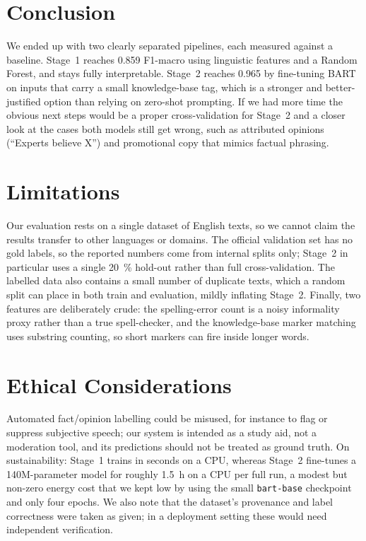 \documentclass[12pt,a4paper,twocolumn]{article}
\begin{document}
\section{Conclusion}
\label{sec:conclusion}
We ended up with two clearly separated pipelines, each measured against a
baseline. Stage~1 reaches \num{0.859} F1-macro using linguistic features and a
Random Forest, and stays fully interpretable. Stage~2 reaches \num{0.965} by
fine-tuning BART on inputs that carry a small knowledge-base tag, which is a
stronger and better-justified option than relying on zero-shot prompting. If we
had more time the obvious next steps would be a proper cross-validation for
Stage~2 and a closer look at the cases both models still get wrong, such as
attributed opinions (``Experts believe X'') and promotional copy that mimics
factual phrasing.

\newpage

\section*{Limitations}
Our evaluation rests on a single dataset of English texts, so we cannot claim the
results transfer to other languages or domains. The official validation set has
no gold labels, so the reported numbers come from internal splits only; Stage~2
in particular uses a single \SI{20}{\percent} hold-out rather than full
cross-validation. The labelled data also contains a small number of duplicate
texts, which a random split can place in both train and evaluation, mildly
inflating Stage~2. Finally, two features are deliberately crude: the
spelling-error count is a noisy informality proxy rather than a true
spell-checker, and the knowledge-base marker matching uses substring counting,
so short markers can fire inside longer words.

\section*{Ethical Considerations}
Automated fact/opinion labelling could be misused, for instance to flag or
suppress subjective speech; our system is intended as a study aid, not a
moderation tool, and its predictions should not be treated as ground truth.
On sustainability: Stage~1 trains in seconds on a CPU, whereas Stage~2 fine-tunes
a 140M-parameter model for roughly \SI{1.5}{\hour} on a CPU per full run, a
modest but non-zero energy cost that we kept low by using the small
\texttt{bart-base} checkpoint and only four epochs. We also note that the
dataset's provenance and label correctness were taken as given; in a deployment
setting these would need independent verification.
\end{document}
